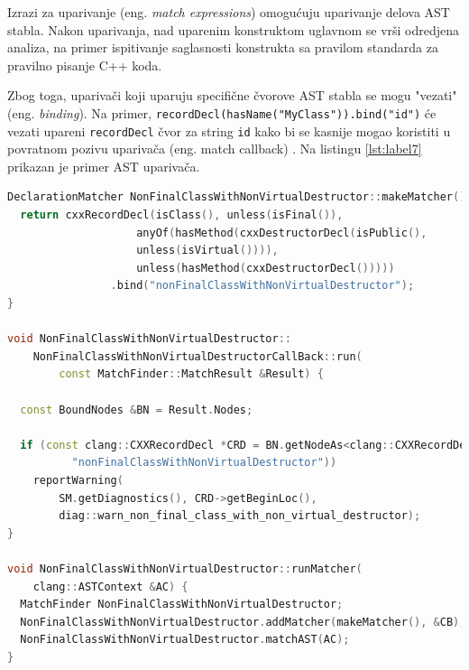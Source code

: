 \documentclass[12pt,oneside]{memoir}
\begin{document}
Izrazi za uparivanje (eng. \textit{match expressions}) omogu\'{c}uju uparivanje delova AST stabla. Nakon uparivanja, nad uparenim konstruktom uglavnom se vr\v{s}i odredjena analiza, na primer ispitivanje saglasnosti konstrukta sa pravilom standarda za pravilno pisanje C++ koda.
\par
Zbog toga, upariva\v{c}i koji uparuju specifi\v{c}ne čvorove AST stabla se mogu "vezati" (eng. \textit{binding}). Na primer, \lstinline{recordDecl(hasName("MyClass")).bind("id")} će vezati upareni \lstinline{recordDecl} čvor za string \lstinline{id} kako bi se kasnije mogao koristiti u povratnom pozivu upariva\v{c}a (eng. match callback) \cite{matchers}. Na listingu \ref{lst:label7} prikazan je primer AST upariva\v{c}a.

\begin{lstlisting}[caption={Primer upariv\v{c}a koji pronalazi sve klase koje nisu obeležene atributom \lstinline{final} i čiji destruktor nije virtuelan, CallBack klase i poziva upariva\v{c}a}, label=lst:label7,language=C++, captionpos=b]
DeclarationMatcher NonFinalClassWithNonVirtualDestructor::makeMatcher() {
  return cxxRecordDecl(isClass(), unless(isFinal()),
                    anyOf(hasMethod(cxxDestructorDecl(isPublic(),
                    unless(isVirtual()))),
                    unless(hasMethod(cxxDestructorDecl()))))
                .bind("nonFinalClassWithNonVirtualDestructor");
}

void NonFinalClassWithNonVirtualDestructor::
    NonFinalClassWithNonVirtualDestructorCallBack::run(
        const MatchFinder::MatchResult &Result) {

  const BoundNodes &BN = Result.Nodes;
  
  if (const clang::CXXRecordDecl *CRD = BN.getNodeAs<clang::CXXRecordDecl>(
          "nonFinalClassWithNonVirtualDestructor"))
    reportWarning(
        SM.getDiagnostics(), CRD->getBeginLoc(),
        diag::warn_non_final_class_with_non_virtual_destructor);
}

void NonFinalClassWithNonVirtualDestructor::runMatcher(
    clang::ASTContext &AC) {
  MatchFinder NonFinalClassWithNonVirtualDestructor;
  NonFinalClassWithNonVirtualDestructor.addMatcher(makeMatcher(), &CB);
  NonFinalClassWithNonVirtualDestructor.matchAST(AC);
}
\end{lstlisting}
\end{document}
